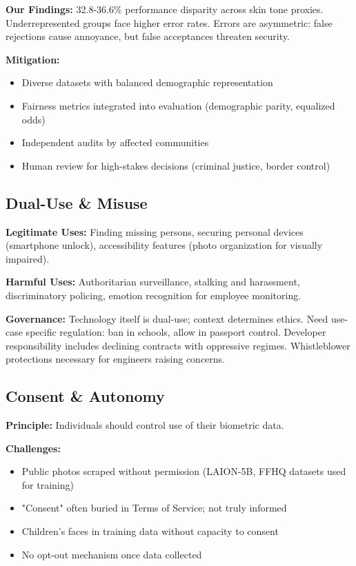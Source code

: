 \documentclass[11pt,a4paper]{article}
\begin{document}
\textbf{Our Findings:} 32.8-36.6\% performance disparity across skin tone proxies. Underrepresented groups face higher error rates. Errors are asymmetric: false rejections cause annoyance, but false acceptances threaten security.

\textbf{Mitigation:}
\begin{itemize}
    \item Diverse datasets with balanced demographic representation
    \item Fairness metrics integrated into evaluation (demographic parity, equalized odds)
    \item Independent audits by affected communities
    \item Human review for high-stakes decisions (criminal justice, border control)
\end{itemize}

\subsection{Dual-Use \& Misuse}

\textbf{Legitimate Uses:} Finding missing persons, securing personal devices (smartphone unlock), accessibility features (photo organization for visually impaired).

\textbf{Harmful Uses:} Authoritarian surveillance, stalking and harassment, discriminatory policing, emotion recognition for employee monitoring.

\textbf{Governance:} Technology itself is dual-use; context determines ethics. Need use-case specific regulation: ban in schools, allow in passport control. Developer responsibility includes declining contracts with oppressive regimes. Whistleblower protections necessary for engineers raising concerns.

\subsection{Consent \& Autonomy}

\textbf{Principle:} Individuals should control use of their biometric data.

\textbf{Challenges:}
\begin{itemize}
    \item Public photos scraped without permission (LAION-5B, FFHQ datasets used for training)
    \item "Consent" often buried in Terms of Service; not truly informed
    \item Children's faces in training data without capacity to consent
    \item No opt-out mechanism once data collected
\end{itemize}
\end{document}
